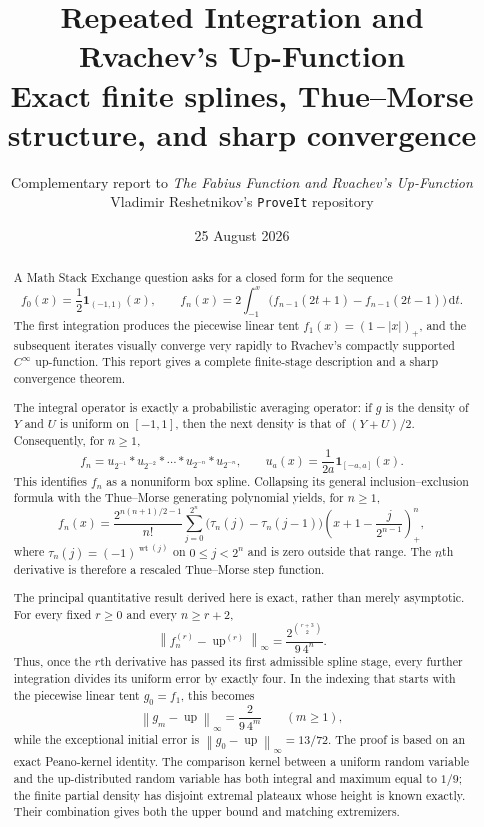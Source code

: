 \documentclass[11pt,oneside]{article}
\title{\textbf{Repeated Integration and Rvachev's Up-Function}\\[0.45em]
\large Exact finite splines, Thue--Morse structure, and sharp convergence}
\author{Complementary report to \emph{The Fabius Function and Rvachev's Up-Function}\\
Vladimir Reshetnikov's \texttt{ProveIt} repository}
\date{25 August 2026}
\theoremstyle{definition}
\theoremstyle{remark}
\newcommand{\Up}{\operatorname{up}}
\newcommand{\conv}{*}
\newcommand{\ind}{\mathbf 1}
\newcommand{\wt}{\operatorname{wt}}
\newcommand{\dd}{\,\mathrm d}
\newcommand{\norm}[1]{\left\lVert#1\right\rVert}
\newcommand{\pos}[1]{\left(#1\right)_{+}}
\begin{document}
\maketitle

\begin{abstract}
A Math Stack Exchange question asks for a closed form for the sequence
\[
 f_0(x)=\frac12\ind_{(-1,1)}(x),\qquad
 f_n(x)=2\int_{-1}^{x}\bigl(f_{n-1}(2t+1)-f_{n-1}(2t-1)\bigr)\dd t.
\]
The first integration produces the piecewise linear tent
$f_1(x)=\pos{1-|x|}$, and the subsequent iterates visually converge very rapidly to
Rvachev's compactly supported $C^\infty$ up-function.  This report gives a complete
finite-stage description and a sharp convergence theorem.

The integral operator is exactly a probabilistic averaging operator: if $g$ is the density
of $Y$ and $U$ is uniform on $[-1,1]$, then the next density is that of $(Y+U)/2$.
Consequently, for $n\ge1$,
\[
 f_n=u_{2^{-1}}\conv u_{2^{-2}}\conv\cdots\conv u_{2^{-n}}\conv u_{2^{-n}},
 \qquad
 u_a(x)=\frac1{2a}\ind_{[-a,a]}(x).
\]
This identifies $f_n$ as a nonuniform box spline.  Collapsing its general
inclusion--exclusion formula with the Thue--Morse generating polynomial yields, for
$n\ge1$,
\[
 f_n(x)=\frac{2^{n(n+1)/2-1}}{n!}
 \sum_{j=0}^{2^n}\bigl(\tau_n(j)-\tau_n(j-1)\bigr)
 \pos{x+1-\frac{j}{2^{n-1}}}^{n},
\]
where $\tau_n(j)=(-1)^{\wt(j)}$ on $0\le j<2^n$ and is zero outside that range.
The $n$th derivative is therefore a rescaled Thue--Morse step function.

The principal quantitative result derived here is exact, rather than merely asymptotic.  For every
fixed $r\ge0$ and every $n\ge r+2$,
\[
 \boxed{\displaystyle
 \norm{f_n^{(r)}-\Up^{(r)}}_\infty
 =\frac{2^{\binom{r+3}{2}}}{9\,4^n}.}
\]
Thus, once the $r$th derivative has passed its first admissible spline stage, every further
integration divides its uniform error by exactly four.  In the indexing that starts with the
piecewise linear tent $g_0=f_1$, this becomes
\[
 \norm{g_m-\Up}_\infty=\frac{2}{9\,4^m}\qquad(m\ge1),
\]
while the exceptional initial error is $\norm{g_0-\Up}_\infty=13/72$.
The proof is based on an exact Peano-kernel identity.  The comparison kernel between a
uniform random variable and the up-distributed random variable has both integral and
maximum equal to $1/9$; the finite partial density has disjoint extremal plateaux whose
height is known exactly.  Their combination gives both the upper bound and matching
extremizers.
\end{abstract}
\end{document}
